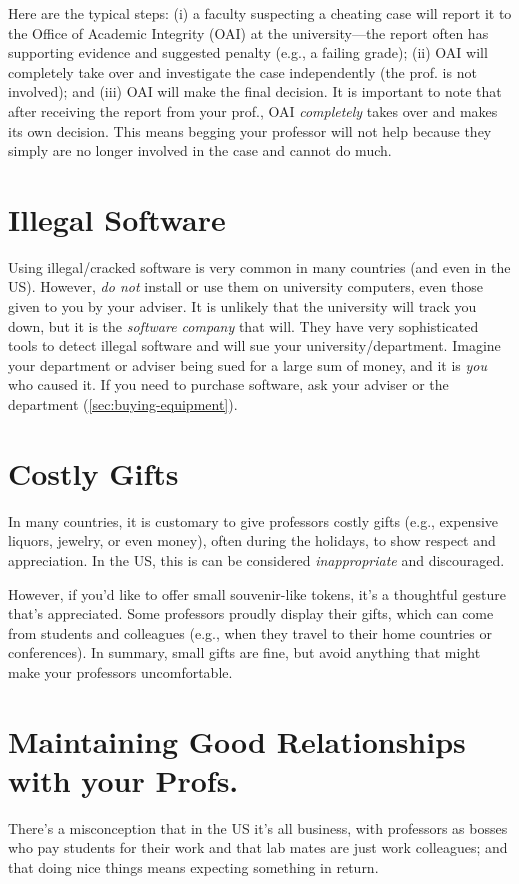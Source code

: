 \documentclass[oneside,11pt,dvipsnames]{book}
\begin{document}
Here are the typical steps: (i) a faculty suspecting a cheating case will report it to the Office of Academic Integrity (OAI) at the university---the report often has supporting evidence and suggested penalty (e.g., a failing grade);  (ii)  OAI will completely take over and investigate the case independently (the prof. is not involved); and (iii) OAI will make the final decision.  It is important to note that after receiving the report from your prof., OAI \emph{completely} takes over and makes its own decision.  This means begging your professor will not help because they simply are no longer involved in the case and cannot do much.

\section{Illegal Software}\label{sec:illegal-software}
 Using illegal/cracked software is very common in many countries (and even in the US). However, \emph{do not} install or use them on university computers, even those given to you by your adviser.  It is unlikely that the university will track you down, but it is the \emph{software company} that will.  They have very sophisticated tools to detect illegal software and will sue your university/department.  Imagine your department or adviser being sued for a large sum of money, and it is \emph{you} who caused it.  If you need to purchase software,  ask your adviser or the department (\autoref{sec:buying-equipment}).


\section{Costly Gifts}\label{sec:gifts} In many countries, it is customary to give professors costly gifts (e.g., expensive liquors, jewelry, or even money), often during the holidays, to show respect and appreciation.  In the US, this is can be considered \emph{inappropriate} and discouraged. 

However, if you'd like to offer small souvenir-like tokens, it's a thoughtful gesture that's appreciated. Some professors proudly display their gifts, which can come from students and colleagues (e.g., when they travel to their home countries or conferences). In summary, small gifts are fine, but avoid anything that might make your professors uncomfortable.


\section{Maintaining Good Relationships with your Profs.}
There's a misconception that in the US it's all business, with professors as bosses who pay students for their work and that lab mates are just work colleagues; and that doing nice things means expecting something in return.
\end{document}
